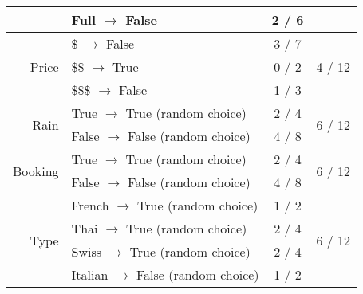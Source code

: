 \documentclass[fontsize=12pt, usenames, dvipsnames, headinclude, headsepline, footinclude, footsepline]{scrartcl}
\begin{document}
\begin{table}[h]
\begin{tabular}{@{}rlcc@{}}
                                            & Full $\to$ False                                    & 2 / 6                      &                                             \\ \midrule
\multirow{3}{*}{Price}                      & \$ $\to$ False                                      & 3 / 7                      & \multirow{3}{*}{4 / 12}                     \\
                                            & \$\$ $\to$ True                                     & 0 / 2                      &                                             \\
                                            & \$\$\$ $\to$ False                                  & 1 / 3                      &                                             \\ \midrule
\multirow{2}{*}{Rain}                       & True $\to$ True (random choice)                     & 2 / 4                      & \multirow{2}{*}{6 / 12}                     \\
                                            & False $\to$ False (random choice)                   & 4 / 8                      &                                             \\ \midrule
\multirow{2}{*}{Booking}                    & True $\to$ True (random choice)                     & 2 / 4                      & \multirow{2}{*}{6 / 12}                     \\
                                            & False $\to$ False (random choice)                   & 4 / 8                      &                                             \\ \midrule
\multirow{4}{*}{Type}                       & French $\to$ True (random choice)                   & 1 / 2                      & \multirow{4}{*}{6 / 12}                     \\
                                            & Thai $\to$ True (random choice)                     & 2 / 4                      &                                             \\
                                            & Swiss $\to$ True (random choice)                    & 2 / 4                      &                                             \\
                                            & Italian $\to$ False (random choice)                 & 1 / 2                      &                                             \\ \midrule

\end{tabular}
\end{table}
\end{document}
